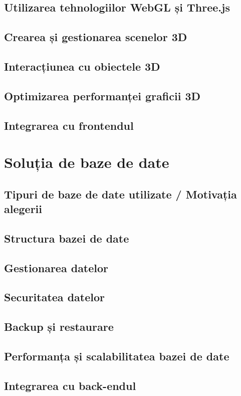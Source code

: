 \subsection{Utilizarea tehnologiilor WebGL și Three.js}
\subsection{Crearea și gestionarea scenelor 3D}
\subsection{Interacțiunea cu obiectele 3D}
\subsection{Optimizarea performanței graficii 3D}
\subsection{Integrarea cu frontendul}

\section{Soluția de baze de date}
\label{sec:proj-database}
\subsection{Tipuri de baze de date utilizate / Motivația alegerii}
\subsection{Structura bazei de date}
\subsection{Gestionarea datelor}
\subsection{Securitatea datelor}
\subsection{Backup și restaurare}
\subsection{Performanța și scalabilitatea bazei de date}
\subsection{Integrarea cu back-endul}

